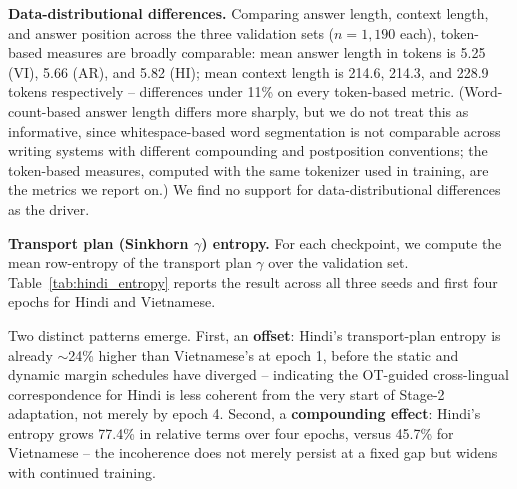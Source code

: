 \documentclass[11pt]{article}
\begin{document}
\textbf{Data-distributional differences.} Comparing answer length, context length, and answer position across the three validation sets ($n=1,190$ each), token-based measures are broadly comparable: mean answer length in tokens is 5.25 (VI), 5.66 (AR), and 5.82 (HI); mean context length is 214.6, 214.3, and 228.9 tokens respectively -- differences under 11\% on every token-based metric. (Word-count-based answer length differs more sharply, but we do not treat this as informative, since whitespace-based word segmentation is not comparable across writing systems with different compounding and postposition conventions; the token-based measures, computed with the same tokenizer used in training, are the metrics we report on.) We find no support for data-distributional differences as the driver.

\textbf{Transport plan (Sinkhorn $\gamma$) entropy.} For each checkpoint, we compute the mean row-entropy of the transport plan $\gamma$ over the validation set. Table~\ref{tab:hindi_entropy} reports the result across all three seeds and first four epochs for Hindi and Vietnamese.

\begin{table}[ht]
\centering
\small
{}
\caption{Mean Sinkhorn transport-plan entropy by epoch and language (mean over 3 seeds).}
\label{tab:hindi_entropy}
\end{table}

Two distinct patterns emerge. First, an \textbf{offset}: Hindi's transport-plan entropy is already $\sim$24\% higher than Vietnamese's at epoch 1, before the static and dynamic margin schedules have diverged -- indicating the OT-guided cross-lingual correspondence for Hindi is less coherent from the very start of Stage-2 adaptation, not merely by epoch 4. Second, a \textbf{compounding effect}: Hindi's entropy grows 77.4\% in relative terms over four epochs, versus 45.7\% for Vietnamese -- the incoherence does not merely persist at a fixed gap but widens with continued training.
\end{document}

